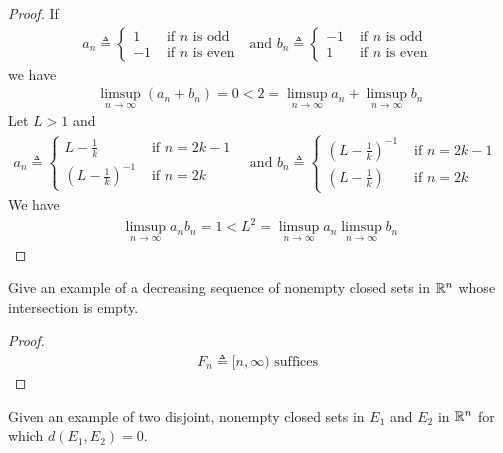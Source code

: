 \documentclass{report}
\begin{document}
\begin{proof}
If 
\begin{align*}
a_n\triangleq \begin{cases}
  1& \text{ if $n$ is odd }\\
  -1& \text{ if $n$ is even }
\end{cases}\text{ and }b_n\triangleq \begin{cases}
  -1& \text{ if $n$ is odd }\\
  1& \text{ if $n$ is even }
\end{cases}
\end{align*}
we have 
\begin{align*}
\limsup_{n\to\infty} (a_n+b_n)=0<2=\limsup_{n\to\infty} a_n+\limsup_{n\to\infty} b_n
\end{align*}
Let $L>1$ and 
\begin{align*}
a_n\triangleq \begin{cases}
  L-\frac{1}{k}& \text{ if $n=2k-1$ }\\
  (L-\frac{1}{k})^{-1}& \text{ if $n=2k$ }
\end{cases} \text{ and }b_n\triangleq \begin{cases}
(L-\frac{1}{k})^{-1}& \text{ if $n=2k-1$ }\\
(L-\frac{1}{k})& \text{ if $n=2k$ }
\end{cases}
\end{align*}
We have 
\begin{align*}
\limsup_{n\to\infty} a_nb_n=1< L^2= \limsup_{n\to\infty} a_n \limsup_{n\to\infty}  b_n
\end{align*}
\end{proof}
\begin{question}{}{}
Give an example of a decreasing sequence of nonempty closed sets in $\mathbb{R}^n$ whose intersection is empty. 
\end{question}
\begin{proof}
\begin{align*}
F_n\triangleq  [n,\infty)\text{ suffices }
\end{align*}
\end{proof}
\begin{question}{}{}
Given an example of two disjoint, nonempty closed sets in $E_1$ and  $E_2$ in  $\mathbb{R}^n$ for which  $d(E_1,E_2)=0$.
\end{question}
\end{document}
